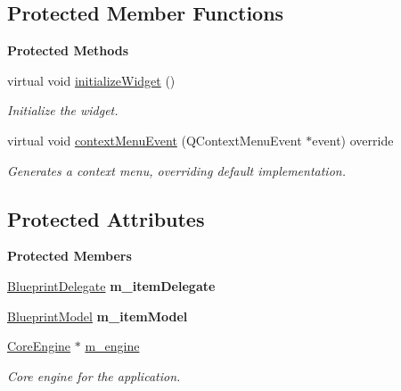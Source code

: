 \subsection*{Protected Member Functions}
\begin{Indent}\textbf{ Protected Methods}\par
\begin{DoxyCompactItemize}
\item 
\mbox{\label{classrev_1_1_view_1_1_blueprint_list_view_a6e87a2a53ca77678978ae1f7eb16a5e7}} 
virtual void \mbox{\hyperlink{classrev_1_1_view_1_1_blueprint_list_view_a6e87a2a53ca77678978ae1f7eb16a5e7}{initialize\+Widget}} ()
\begin{DoxyCompactList}\small\item\em Initialize the widget. \end{DoxyCompactList}\item 
virtual void \mbox{\hyperlink{classrev_1_1_view_1_1_blueprint_list_view_add611c892518e8bab79ec2a8f4cd3896}{context\+Menu\+Event}} (Q\+Context\+Menu\+Event $\ast$event) override
\begin{DoxyCompactList}\small\item\em Generates a context menu, overriding default implementation. \end{DoxyCompactList}\end{DoxyCompactItemize}
\end{Indent}
\subsection*{Protected Attributes}
\begin{Indent}\textbf{ Protected Members}\par
\begin{DoxyCompactItemize}
\item 
\mbox{\label{classrev_1_1_view_1_1_blueprint_list_view_a4c6cec2a817f6007830800b9616b73dc}} 
\mbox{\hyperlink{classrev_1_1_view_1_1_blueprint_delegate}{Blueprint\+Delegate}} {\bfseries m\+\_\+item\+Delegate}
\item 
\mbox{\label{classrev_1_1_view_1_1_blueprint_list_view_a0c1e4545be15de0aa4b2984ec359c449}} 
\mbox{\hyperlink{classrev_1_1_view_1_1_blueprint_model}{Blueprint\+Model}} {\bfseries m\+\_\+item\+Model}
\item 
\mbox{\label{classrev_1_1_view_1_1_blueprint_list_view_ab79b1761dc5662c28cdacdb32d85fea6}} 
\mbox{\hyperlink{classrev_1_1_core_engine}{Core\+Engine}} $\ast$ \mbox{\hyperlink{classrev_1_1_view_1_1_blueprint_list_view_ab79b1761dc5662c28cdacdb32d85fea6}{m\+\_\+engine}}
\begin{DoxyCompactList}\small\item\em Core engine for the application. \end{DoxyCompactList}\end{DoxyCompactItemize}
\end{Indent}

